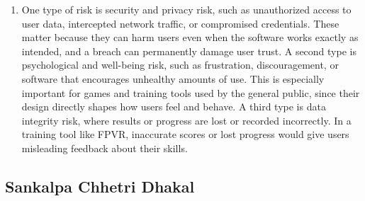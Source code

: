 \documentclass{article}
\begin{document}
\begin{enumerate}
    \item %
    One type of risk is security and privacy risk, such as unauthorized access
    to user data, intercepted network traffic, or compromised credentials.
    These matter because they can harm users even when the software works
    exactly as intended, and a breach can permanently damage user trust.
    A second type is psychological and well-being risk, such as frustration,
    discouragement, or software that encourages unhealthy amounts of use.
    This is especially important for games and training tools used by the
    general public, since their design directly shapes how users feel and
    behave. A third type is data integrity risk, where results or progress
    are lost or recorded incorrectly. In a training tool like FPVR, inaccurate
    scores or lost progress would give users misleading feedback about their
    skills.

\end{enumerate}
    
\subsection*{Sankalpa Chhetri Dhakal}
\end{document}
